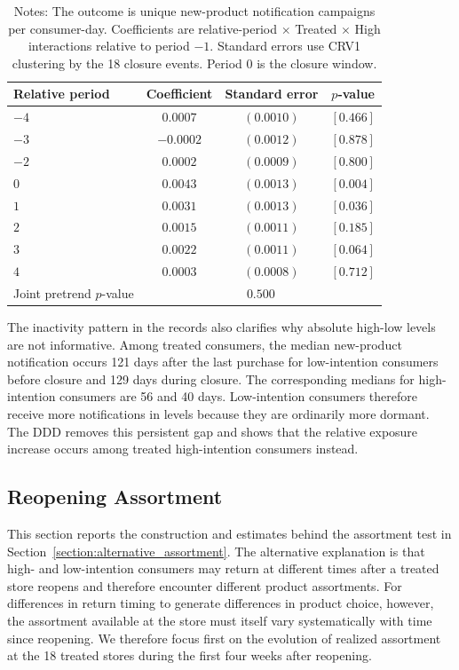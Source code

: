 \documentclass[11 pt]{article}
\newcommand\fnote[1]{\captionsetup{font=footnotesize}\caption*{#1}}
\begin{document}
\begin{table}[!ht]
\centering
\caption{Event-study path of new-product notification exposure}
\label{tab:appendix_new_product_notification_dynamics}
\small
\begin{tabular}{lccc}
\toprule
Relative period & Coefficient & Standard error & $p$-value \\
\midrule
$-4$ & $0.0007$ & $(0.0010)$ & $[0.466]$ \\
$-3$ & $-0.0002$ & $(0.0012)$ & $[0.878]$ \\
$-2$ & $0.0002$ & $(0.0009)$ & $[0.800]$ \\
$0$ & $0.0043$ & $(0.0013)$ & $[0.004]$ \\
$1$ & $0.0031$ & $(0.0013)$ & $[0.036]$ \\
$2$ & $0.0015$ & $(0.0011)$ & $[0.185]$ \\
$3$ & $0.0022$ & $(0.0011)$ & $[0.064]$ \\
$4$ & $0.0003$ & $(0.0008)$ & $[0.712]$ \\
\addlinespace
Joint pretrend $p$-value & \multicolumn{3}{c}{$0.500$} \\
\bottomrule
\end{tabular}
\vspace{1mm}
\fnote{Notes: The outcome is unique new-product notification campaigns per consumer-day. Coefficients are relative-period $\times$ Treated $\times$ High interactions relative to period $-1$. Standard errors use CRV1 clustering by the 18 closure events. Period 0 is the closure window.}
\end{table}

The inactivity pattern in the records also clarifies why absolute high-low levels are not informative. Among treated consumers, the median new-product notification occurs 121 days after the last purchase for low-intention consumers before closure and 129 days during closure. The corresponding medians for high-intention consumers are 56 and 40 days. Low-intention consumers therefore receive more notifications in levels because they are ordinarily more dormant. The DDD removes this persistent gap and shows that the relative exposure increase occurs among treated high-intention consumers instead.


\subsection{Reopening Assortment}
\label{app:reopening_assortment}

This section reports the construction and estimates behind the assortment test in Section~\ref{section:alternative_assortment}. The alternative explanation is that high- and low-intention consumers may return at different times after a treated store reopens and therefore encounter different product assortments. For differences in return timing to generate differences in product choice, however, the assortment available at the store must itself vary systematically with time since reopening. We therefore focus first on the evolution of realized assortment at the 18 treated stores during the first four weeks after reopening.
\end{document}
